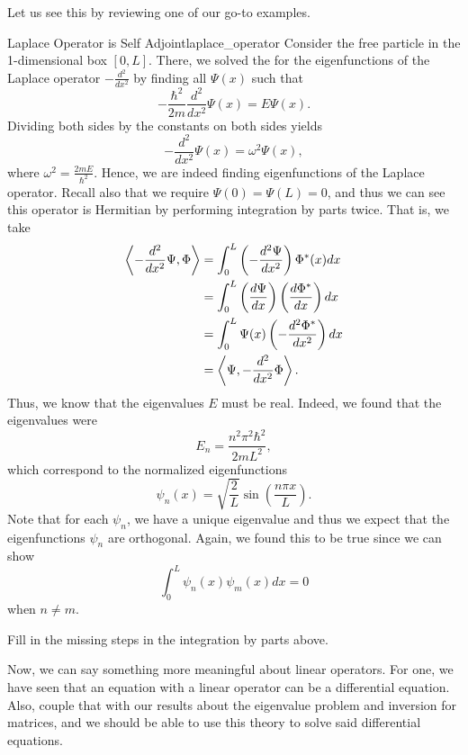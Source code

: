 Let us see this by reviewing one of our go-to examples. 

\begin{ex}{Laplace Operator is Self Adjoint}{laplace_operator}
	Consider the free particle in the 1-dimensional box $[0,L]$.  There, we solved the for the eigenfunctions of the Laplace operator $-\frac{d^2}{dx^2}$ by finding all $\Psi(x)$ such that
	\[
	-\frac{\hbar^2}{2m}\frac{d^2}{dx^2}\Psi(x)=E\Psi(x).
	\]
	Dividing both sides by the constants on both sides yields
	\[
	-\frac{d^2}{dx^2}\Psi(x) = \omega^2 \Psi(x),
	\]
	where $\omega^2 = \frac{2mE}{\hbar^2}$. Hence, we are indeed finding eigenfunctions of the Laplace operator. Recall also that we require $\Psi(0)=\Psi(L)=0$, and thus we can see this operator is Hermitian by performing integration by parts twice. That is, we take
	\begin{align*}
	\left\langle -\frac{d^2}{dx^2} \Psi, \Phi \right\rangle &=\int_0^L\left( -\frac{d^2\Psi}{dx^2}\right)\Phi^*(x)dx\\
	&= \int_0^L \left(\frac{d\Psi}{dx}\right) \left(\frac{d\Phi^*}{dx}\right)dx\\
	&= \int_0^L \Psi(x)\left(-\frac{d^2 \Phi^*}{dx^2}\right)dx\\
	&= \left\langle \Psi, -\frac{d^2}{dx^2}\Phi \right\rangle.
	\end{align*}
	Thus, we know that the eigenvalues $E$ must be real. Indeed, we found that the eigenvalues were 
	\[
	E_n = \frac{n^2 \pi^2 \hbar^2}{2mL^2},
	\]
	which correspond to the normalized eigenfunctions
	\[
	\psi_n(x)=\sqrt{\frac{2}{L}} \sin\left(\frac{n\pi x}{L}\right).
	\]
	Note that for each $\psi_n$, we have a unique eigenvalue and thus we expect that the eigenfunctions $\psi_n$ are orthogonal. Again, we found this to be true since we can show
	\[
	\int_0^L \psi_n(x) \psi_m(x)dx = 0 
	\]
	when $n\neq m$.  
	\end{ex}
	
\begin{exercise}
	Fill in the missing steps in the integration by parts above.
\end{exercise}

Now, we can say something more meaningful about linear operators.  For one, we have seen that an equation with a linear operator can be a differential equation.  Also, couple that with our results about the eigenvalue problem and inversion for matrices, and we should be able to use this theory to solve said differential equations.  

